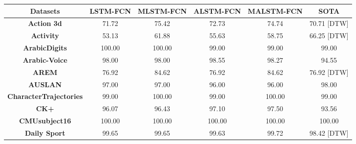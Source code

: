\documentclass[preprint,12pt,3p]{elsarticle}
\begin{document}
\begin{table*}[htpb]
\begin{adjustbox}{width=1 \linewidth}
 \begin{tabularx}{1.4 \textwidth}{|C|C|C|C|C|C|}
\hline
    \textbf{Datasets} & \textbf{LSTM-FCN} & \textbf{MLSTM-FCN} & \textbf{ALSTM-FCN} & \textbf{MALSTM-FCN} & {\textbf{SOTA}} \\
    \hline
   {\textbf{Action 3d}} & 71.72 & 75.42 & 72.73 & \textcolor[rgb]{ 1,  0,  0}{74.74} & 70.71 [DTW] \\
    \hline
   {\textbf{Activity}} & 53.13 & 61.88 & 55.63 & \textcolor[rgb]{ 1,  0,  0}{58.75} & 66.25 [DTW] \\
    \hline
    \textbf{ArabicDigits} & 100.00 & 100.00 & 99.00 & 99.00 & 99.00 \cite{schafer2017multivariate} \\
    \hline
   {\textbf{Arabic-Voice}} & 98.00 & 98.00 & 98.55 & 98.27 & 94.55 \cite{pei2017multivariate} \\
    \hline
    \textbf{AREM} & 76.92 & 84.62 & 76.92 & 84.62 & 76.92 [DTW] \\
    \hline
    \textbf{AUSLAN} & 97.00 & 97.00 & 96.00 & 96.00 & 98.00 \cite{schafer2017multivariate} \\
    \hline
    \textbf{CharacterTrajectories} & 99.00 & 100.00 & 99.00 & 100.00 & 99.00 \cite{schafer2017multivariate} \\
    \hline
   {\textbf{CK+}} & 96.07 & 96.43 & 97.10 & 97.50 & 93.56 \cite{pei2017multivariate} \\
    \hline
    \textbf{CMUsubject16} & 100.00 & 100.00 & 100.00 & 100.00 & 100.00 \cite{mvARF} \\
    \hline
    \textbf{Daily Sport} & 99.65 & 99.65 & 99.63 & 99.72 & 98.42 [DTW] \\

\end{tabularx}
\end{adjustbox}
\end{table*}
\end{document}
